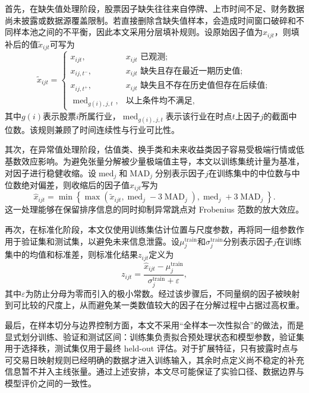 首先，在缺失值处理阶段，股票因子缺失往往来自停牌、上市时间不足、财务数据尚未披露或数据源覆盖限制。若直接删除含缺失值样本，会造成时间窗口破碎和不同样本池之间的不平衡，因此本文采用分层填补规则。设原始因子值为$x_{ijt}$，则填补后的值$\tilde{x}_{ijt}$可写为
\begin{equation}
\tilde{x}_{ijt}=
\begin{cases}
x_{ijt}, & x_{ijt}\text{ 已观测};\\
x_{ij,t^-}, & x_{ijt}\text{ 缺失且存在最近一期历史值};\\
x_{ij,t^+}, & x_{ijt}\text{ 缺失且不存在历史值但存在后续值};\\
\operatorname{med}_{g(i),j,t}, & \text{以上条件均不满足},
\end{cases}
\end{equation}
其中$g(i)$表示股票$i$所属行业，$\operatorname{med}_{g(i),j,t}$表示该行业在时点$t$上因子$j$的截面中位数。该规则兼顾了时间连续性与行业可比性。

其次，在异常值处理阶段，估值类、换手类和未来收益类因子容易受极端行情或低基数效应影响。为避免张量分解被少量极端值主导，本文以训练集统计量为基准，对因子进行稳健收缩。设$\operatorname{med}_j$和$\operatorname{MAD}_j$分别表示因子$j$在训练集中的中位数与中位数绝对偏差，则收缩后的因子值$\hat{x}_{ijt}$写为
\begin{equation}
\hat{x}_{ijt}
=\min\left\{\max\left(\tilde{x}_{ijt},\operatorname{med}_j-3\operatorname{MAD}_j\right),\operatorname{med}_j+3\operatorname{MAD}_j\right\}.
\end{equation}
这一处理能够在保留排序信息的同时抑制异常跳点对 Frobenius 范数的放大效应。

再次，在标准化阶段，本文仅使用训练集估计位置与尺度参数，再将同一组参数作用于验证集和测试集，以避免未来信息泄露。设$\mu_j^{\mathrm{train}}$和$\sigma_j^{\mathrm{train}}$分别表示因子$j$在训练集中的均值和标准差，则标准化结果$z_{ijt}$定义为
\begin{equation}
z_{ijt}=\frac{\hat{x}_{ijt}-\mu_j^{\mathrm{train}}}{\sigma_j^{\mathrm{train}}+\varepsilon},
\end{equation}
其中$\varepsilon$为防止分母为零而引入的极小常数。经过该步骤后，不同量纲的因子被映射到可比较的尺度上，从而避免某一类数值较大的因子在分解过程中占据过高权重。

最后，在样本切分与边界控制方面，本文不采用“全样本一次性拟合”的做法，而是显式划分训练、验证和测试区间：训练集负责拟合预处理状态和模型参数，验证集用于选择秩，测试集仅用于最终 held-out 评估。对于扩展特征，只有披露时点与可交易日映射规则已经明确的数据才进入训练输入，其余时点定义尚不稳定的补充信息暂不并入主线张量。通过上述安排，本文尽可能保证了实验口径、数据边界与模型评价之间的一致性。

